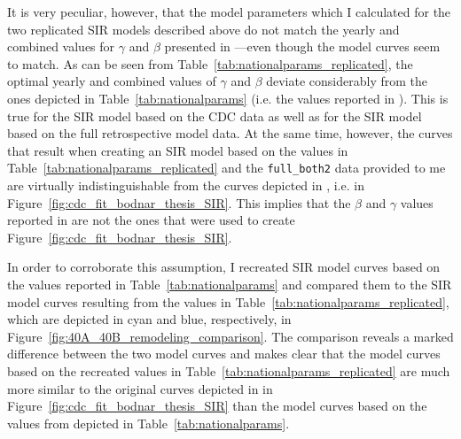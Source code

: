 \documentclass[11pt, a4paper,twoside]{report}\usepackage[]{graphicx}\usepackage[]{color}
\begin{document}
It is very peculiar, however, that the model parameters which I calculated for the two replicated SIR models described above do not match the yearly and combined values for $\gamma$ and $\beta$ presented in \citep{bodnar_data_2015}---even though the model curves seem to match. As can be seen from Table~\ref{tab:nationalparams_replicated}, the optimal yearly and combined values of $\gamma$ and $\beta$ deviate considerably from the ones depicted in Table~\ref{tab:nationalparams} (i.e. the values reported in \citep{bodnar_data_2015}). This is true for the SIR model based on the CDC data as well as for the SIR model based on the full retrospective model data. At the same time, however, the curves that result when creating an SIR model based on the values in Table~\ref{tab:nationalparams_replicated} and the \texttt{full\_both2} data provided to me are virtually indistinguishable from the curves depicted in \cite{bodnar_data_2015}, i.e. in Figure~\ref{fig:cdc_fit_bodnar_thesis_SIR}. This implies that the $\beta$ and $\gamma$ values reported in \cite{bodnar_data_2015} are not the ones that were used to create Figure~\ref{fig:cdc_fit_bodnar_thesis_SIR}.

In order to corroborate this assumption, I recreated SIR model curves based on the values reported in Table~\ref{tab:nationalparams} and compared them to the SIR model curves resulting from the values in Table~\ref{tab:nationalparams_replicated}, which are depicted in cyan and blue, respectively, in Figure~\ref{fig:40A_40B_remodeling_comparison}. The comparison reveals a marked difference between the two model curves and makes clear that the model curves based on the recreated values in Table~\ref{tab:nationalparams_replicated} are much more similar to the original curves depicted in in Figure~\ref{fig:cdc_fit_bodnar_thesis_SIR} than the model curves based on the values from \cite{bodnar_data_2015} depicted in Table~\ref{tab:nationalparams}.\clearpage
\end{document}
